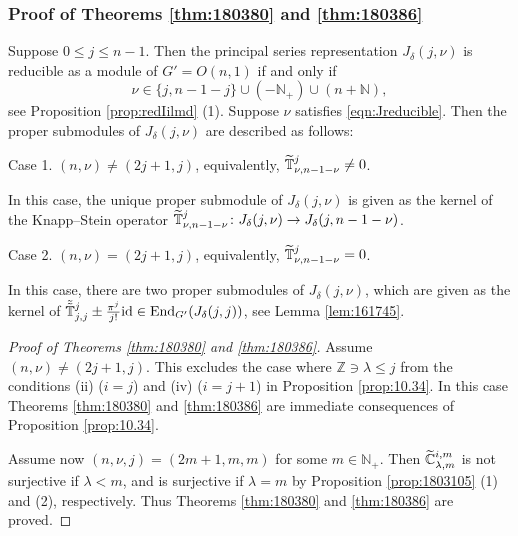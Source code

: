 \subsubsection{Proof of Theorems \ref{thm:180380} and \ref{thm:180386}}
\label{subsec:10.6.4}
Suppose $0 \le j \le n-1$.  
Then the principal series representation $J_{\delta}(j,\nu)$
 is reducible as a module of $G'=O(n,1)$
 if and only if
\begin{equation}
\label{eqn:Jreducible}
\nu \in \{j,n-1-j\} \cup (-{\mathbb{N}}_+) \cup (n + {\mathbb{N}}), 
\end{equation}
see Proposition \ref{prop:redIilmd} (1).  
Suppose $\nu$ satisfies \eqref{eqn:Jreducible}.  
Then the proper submodules
 of $J_{\delta}(j,\nu)$ are described as follows:
\par\noindent
{Case 1.}\enspace
$(n,\nu) \ne (2j+1,j)$, 
 equivalently,
 $\widetilde{{\mathbb{T}}}_{{\nu},{n-1-\nu}}^{{j}} \ne 0$.  
\par
In this case, 
 the unique proper submodule
 of $J_{\delta}(j,\nu)$ is given as the kernel 
 of the Knapp--Stein operator
 $\widetilde{{\mathbb{T}}}_{{\nu},{n-1-\nu}}^{{j}} \colon J_{\delta}(j,\nu) \to J_{\delta}(j,n-1-\nu)$.  
\par\noindent
{Case 2.}\enspace
$(n,\nu) = (2j+1,j)$, 
 equivalently,
 $\widetilde{{\mathbb{T}}}_{{\nu},{n-1-\nu}}^{{j}} = 0$.  
\par
In this case, 
 there are two proper submodules
 of $J_{\delta}(j,\nu)$, 
 which are given as the kernel 
 of 
 $\tilde{\tilde{{\mathbb{T}}}}_{{j},{j}}^{{j}} \pm \frac{\pi^j}{j!}{\operatorname{id}}
  \in {\operatorname{End}}_{G'}(J_{\delta}(j,j))$, 
 see Lemma \ref{lem:161745}.  
\begin{proof}
[Proof of Theorems \ref{thm:180380} and \ref{thm:180386}]
Assume $(n,\nu) \ne (2j+1,j)$.  
This excludes the case 
 where ${\mathbb{Z}} \ni \lambda \le j$ from the conditions (ii) 
 ($i=j$) and (iv) ($i=j+1$)
 in Proposition \ref{prop:10.34}.  
In this case 
 Theorems \ref{thm:180380} and \ref{thm:180386}
 are immediate consequences of Proposition \ref{prop:10.34}.  



Assume now $(n,\nu,j)=(2m+1,m,m)$ for some $m \in {\mathbb{N}}_+$.  
Then $\widetilde{{\mathbb{C}}}_{{\lambda},{m}}^{{i,m}}$ is not surjective
 if $\lambda < m$, 
 and is surjective if $\lambda=m$
 by Proposition \ref{prop:1803105} (1) and (2), 
 respectively.  
Thus Theorems \ref{thm:180380} and \ref{thm:180386} are proved.  
\end{proof}

